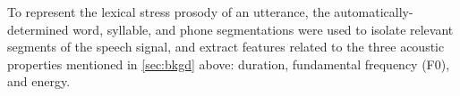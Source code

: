 \documentclass[a4paper]{article}
\begin{document}
	    To represent the lexical stress prosody of an utterance, the automatically-determined word, syllable, and phone segmentations were used to isolate relevant segments of the speech signal, and extract features related to the three acoustic properties mentioned in \cref{sec:bkgd} above: duration, fundamental frequency (F0), and energy. 
	    
	     
	    
\end{document}
